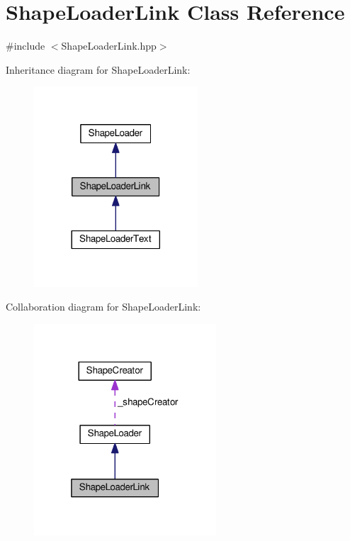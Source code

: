 \hypertarget{class_shape_loader_link}{}\section{Shape\+Loader\+Link Class Reference}
\label{class_shape_loader_link}


{\ttfamily \#include $<$Shape\+Loader\+Link.\+hpp$>$}



Inheritance diagram for Shape\+Loader\+Link\+:\nopagebreak
\begin{figure}[H]
\begin{center}
\leavevmode
\includegraphics[width=173pt]{class_shape_loader_link__inherit__graph}
\end{center}
\end{figure}


Collaboration diagram for Shape\+Loader\+Link\+:\nopagebreak
\begin{figure}[H]
\begin{center}
\leavevmode
\includegraphics[width=193pt]{class_shape_loader_link__coll__graph}
\end{center}
\end{figure}
